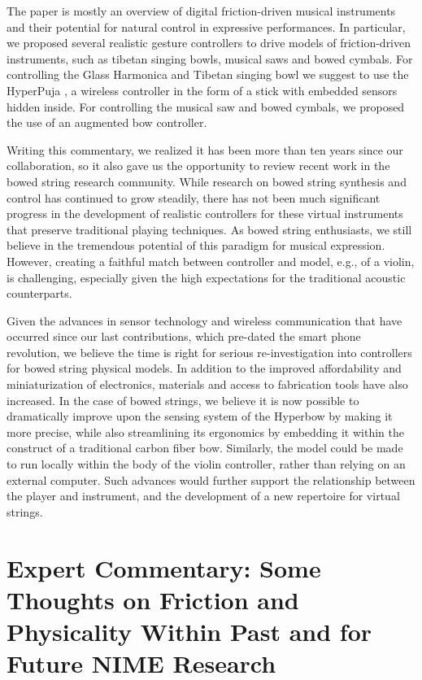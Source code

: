 The paper is mostly an overview of digital friction-driven musical instruments and their potential for natural control in expressive performances. In particular, we proposed several realistic gesture controllers to drive models of friction-driven instruments, such as tibetan singing bowls, musical saws and bowed cymbals. For controlling the Glass Harmonica and Tibetan singing bowl we suggest to use the HyperPuja \cite{Young:2003a}, a wireless controller in the form of a stick with embedded sensors hidden inside. For controlling the musical saw and bowed cymbals, we proposed the use of an augmented bow controller.

Writing this commentary, we realized it has been more than ten years since our collaboration, so it also gave us the opportunity to review recent work in the bowed string research community. While research on bowed string synthesis and control has continued to grow steadily, there has not been much significant progress in the development of realistic controllers for these virtual instruments that preserve traditional playing techniques. As bowed string enthusiasts, we still believe in the tremendous potential of this paradigm for musical expression. However, creating a faithful match between controller and model, e.g., of a violin, is challenging, especially given the high expectations for the traditional acoustic counterparts. 

Given the advances in sensor technology and wireless communication that have occurred since our last contributions, which pre-dated the smart phone revolution, we believe the time is right for serious re-investigation into controllers for bowed string physical models. In addition to the improved affordability and miniaturization of electronics, materials and access to fabrication tools have also increased. In the case of bowed strings, we believe it is now possible to dramatically improve upon the sensing system of the Hyperbow by making it more precise, while also streamlining its ergonomics by embedding it within the construct of a traditional carbon fiber bow. Similarly, the model could be made to run locally within the body of the violin controller, rather than relying on an external computer. Such advances would further support the relationship between the player and instrument, and the development of a new repertoire for virtual strings. 



\section*{Expert Commentary: Some Thoughts on Friction and Physicality Within Past and for Future NIME Research}

